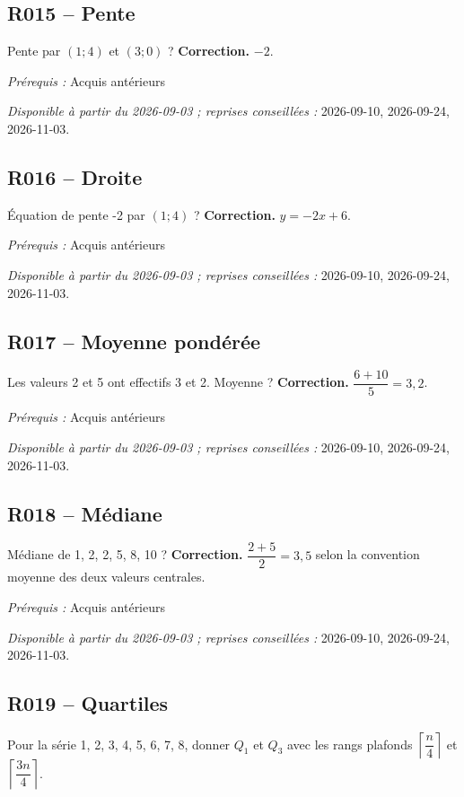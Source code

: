 \subsection*{R015 -- Pente}\label{R015}
Pente par $(1;4)$ et $(3;0)$ ?
\ifprof\textbf{Correction.} $-2$.\par\textit{Prérequis :} Acquis antérieurs\par\textit{Disponible à partir du 2026-09-03 ; reprises conseillées :} 2026-09-10, 2026-09-24, 2026-11-03.\fi
{}\subsection*{R016 -- Droite}\label{R016}
Équation de pente -2 par $(1;4)$ ?
\ifprof\textbf{Correction.} $y=-2x+6$.\par\textit{Prérequis :} Acquis antérieurs\par\textit{Disponible à partir du 2026-09-03 ; reprises conseillées :} 2026-09-10, 2026-09-24, 2026-11-03.\fi
{}\subsection*{R017 -- Moyenne pondérée}\label{R017}
Les valeurs 2 et 5 ont effectifs 3 et 2. Moyenne ?
\ifprof\textbf{Correction.} $\dfrac{6+10}{5}=3{,}2$.\par\textit{Prérequis :} Acquis antérieurs\par\textit{Disponible à partir du 2026-09-03 ; reprises conseillées :} 2026-09-10, 2026-09-24, 2026-11-03.\fi
{}\subsection*{R018 -- Médiane}\label{R018}
Médiane de 1, 2, 2, 5, 8, 10 ?
\ifprof\textbf{Correction.} $\dfrac{2+5}{2}=3{,}5$ selon la convention moyenne des deux valeurs centrales.\par\textit{Prérequis :} Acquis antérieurs\par\textit{Disponible à partir du 2026-09-03 ; reprises conseillées :} 2026-09-10, 2026-09-24, 2026-11-03.\fi
{}\subsection*{R019 -- Quartiles}\label{R019}
Pour la série 1, 2, 3, 4, 5, 6, 7, 8, donner $Q_1$ et $Q_3$ avec les rangs plafonds $\left\lceil\dfrac n4\right\rceil$ et $\left\lceil\dfrac{3n}4\right\rceil$.
